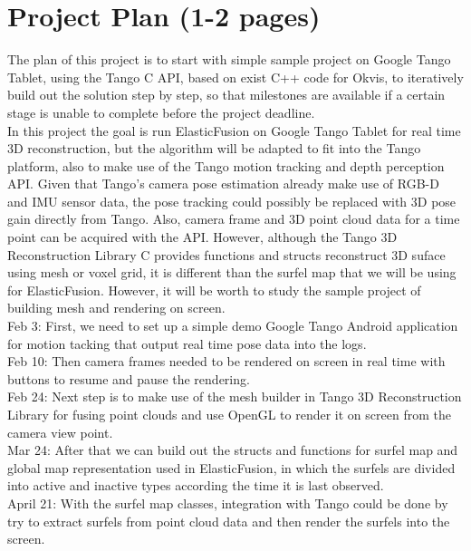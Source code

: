 \documentclass[12pt,twoside]{article}
\begin{document}
\section{Project Plan (1-2 pages)}
The plan of this project is to start with simple sample project on Google Tango Tablet, using the Tango C API, based on exist C++ code for Okvis\cite{leutenegger2015keyframe}, to iteratively build out the solution step by step, so that milestones are available if a certain stage is unable to complete before the project deadline.\\
In this project the goal is run ElasticFusion\citep{whelan2015elasticfusion} on Google Tango Tablet for real time 3D reconstruction, but the algorithm will be adapted to fit into the Tango platform, also to make use of the Tango motion tracking and depth perception API. Given that Tango's camera pose estimation already make use of RGB-D and IMU sensor data, the pose tracking could possibly be replaced with 3D pose gain directly from Tango. Also, camera frame and 3D point cloud data for a time point can be acquired with the API. However, although the Tango 3D Reconstruction Library C provides functions and structs reconstruct 3D suface using mesh or voxel grid, it is different than the surfel map that we will be using for ElasticFusion\citep{whelan2015elasticfusion}. However, it will be worth to study the sample project of building mesh and rendering on screen.\\

Feb 3: First, we need to set up a simple demo Google Tango Android application for motion tacking that output real time pose data into the logs.\\

Feb 10: Then camera frames needed to be rendered on screen in real time with buttons to resume and pause the rendering.\\

Feb 24: Next step is to make use of the mesh builder in Tango 3D Reconstruction Library for fusing point clouds and use OpenGL to render it on screen from the camera view point.\\

Mar 24: After that we can build out the structs and functions for surfel map and global map representation used in ElasticFusion\cite{whelan2015elasticfusion}, in which the surfels are divided into active and inactive types according the time it is last observed.\\

April 21: With the surfel map classes, integration with Tango could be done by try to extract surfels from point cloud data and then render the surfels into the screen.\\
\end{document}
